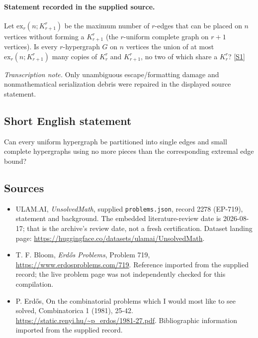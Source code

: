 \documentclass[11pt,a4paper]{article}
\newcommand{\sref}[2]{\hyperlink{source:#1:#2}{[S#2]}}
\begin{document}
\paragraph{Statement recorded in the supplied source.}
Let $\mathrm{ex}_r(n;K_{r+1}^r)$ be the maximum number of $r$-edges that can be placed on $n$ vertices without forming a $K_{r+1}^r$ (the $r$-uniform complete graph on $r+1$ vertices).
Is every $r$-hypergraph $G$ on $n$ vertices the union of at most $\mathrm{ex}_{r}(n;K_{r+1}^r)$ many copies of $K_r^r$ and $K_{r+1}^r$, no two of which share a $K_r^r$? \sref{2278}{1}

{\small\emph{Transcription note.} Only unambiguous escape/formatting damage and nonmathematical serialization debris were repaired in the displayed source statement.}

\subsection{Short English statement}

Can every uniform hypergraph be partitioned into single edges and small complete hypergraphs using no more pieces than the corresponding extremal edge bound?

\subsection{Sources}

{\small

\begin{itemize}

\item[\hypertarget{source:2278:1}{S1}] ULAM.AI, \emph{UnsolvedMath}, supplied \texttt{problems.json}, record 2278 (EP-719), statement and background. The embedded literature-review date is 2026-08-17; that is the archive’s review date, not a fresh certification. Dataset landing page: \url{https://huggingface.co/datasets/ulamai/UnsolvedMath}.

\item[\hypertarget{source:2278:2}{S2}] T. F. Bloom, \emph{Erdős Problems}, Problem 719, \url{https://www.erdosproblems.com/719}. Reference imported from the supplied record; the live problem page was not independently checked for this compilation.

\item[\hypertarget{source:2278:3}{S3}] P. Erdős, On the combinatorial problems which I would most like to see solved, Combinatorica 1 (1981), 25-42. \url{https://static.renyi.hu/~p_erdos/1981-27.pdf}. Bibliographic information imported from the supplied record.

\end{itemize}

}

\label{end:2278}
\end{document}
